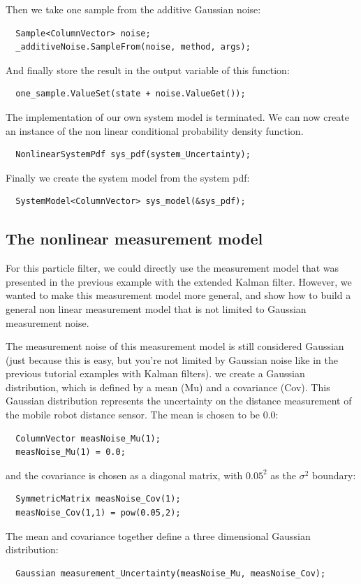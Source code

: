 \documentclass[a4paper,10pt]{report}
\begin{document}
Then we take one sample from the additive Gaussian noise:
\begin{verbatim}
  Sample<ColumnVector> noise;
  _additiveNoise.SampleFrom(noise, method, args);
\end{verbatim}
And finally store the result in the output variable of this function:
\begin{verbatim}
  one_sample.ValueSet(state + noise.ValueGet());
\end{verbatim}
The implementation of our own system model is terminated. We can now
create an instance of the non linear conditional probability density
function.
\begin{verbatim}
  NonlinearSystemPdf sys_pdf(system_Uncertainty);
\end{verbatim}
Finally we create the system model from the system pdf:
\begin{verbatim}
  SystemModel<ColumnVector> sys_model(&sys_pdf);
\end{verbatim}




\subsection{The nonlinear measurement model}
For this particle filter, we could directly use the measurement model
that was presented in the previous example with the extended Kalman
filter. However, we wanted to make this measurement model more
general, and show how to build a general non linear measurement model
that is not limited to Gaussian measurement noise.

The measurement noise of this measurement model is still considered
Gaussian (just because this is easy, but you're not limited by
Gaussian noise like in the previous tutorial examples with Kalman
filters). we create a Gaussian distribution, which is defined by a
mean (Mu) and a covariance (Cov).  This Gaussian distribution
represents the uncertainty on the distance measurement of the mobile
robot distance sensor. The mean is chosen to be $0.0$:
\begin{verbatim}
  ColumnVector measNoise_Mu(1);
  measNoise_Mu(1) = 0.0;
\end{verbatim}
and the covariance is chosen as a diagonal matrix, with $0.05^2$ as
the $\sigma^2$ boundary:
\begin{verbatim}
  SymmetricMatrix measNoise_Cov(1);
  measNoise_Cov(1,1) = pow(0.05,2);
\end{verbatim}
The mean and covariance together define a three dimensional Gaussian
distribution:
\begin{verbatim}
  Gaussian measurement_Uncertainty(measNoise_Mu, measNoise_Cov);
\end{verbatim}
\end{document}
